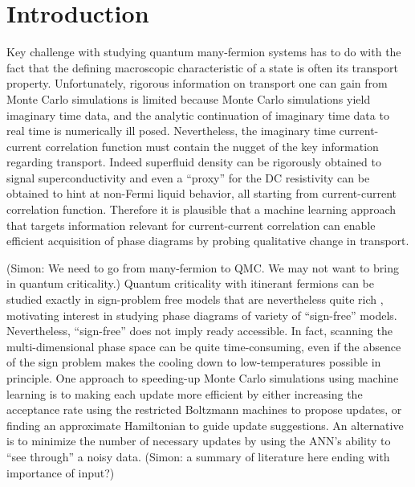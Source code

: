 \documentclass[amsmath,amssymb, aps, prl, twocolumn]{revtex4-1}
\begin{document}
\maketitle

\section{Introduction}

Key challenge with studying quantum many-fermion systems has to do with the fact that the defining macroscopic characteristic of a state is often its transport property. Unfortunately, 
rigorous information on transport one can gain from Monte Carlo simulations is limited because Monte Carlo simulations yield imaginary time data, and the analytic continuation of imaginary time data to real time is numerically ill posed. Nevertheless, the imaginary time current-current correlation function must contain the nugget of the key information regarding transport. Indeed 
superfluid density can be rigorously obtained to signal superconductivity\cite{Scalapino1993} and even a “proxy” for the DC resistivity can be obtained to hint at non-Fermi liquid behavior\cite{Lederer2017}, all starting from current-current correlation function. Therefore it is plausible that a machine learning approach that targets information relevant for current-current correlation can enable efficient acquisition of phase diagrams by probing qualitative change in transport.

{\color{red} (Simon: We need to go from many-fermion to QMC. We may not want to bring in quantum criticality.)} Quantum criticality with itinerant fermions can be studied exactly in sign-problem free models that are nevertheless quite rich \cite{Berg2012,Schattner2016a,Gerlach2017,Xu2017a,Lederer2017,Li2016,Li2017,Jiang2017}, motivating interest in studying phase diagrams of variety of  “sign-free” models. Nevertheless, ``sign-free'' does not imply ready accessible. 
In fact, scanning the multi-dimensional phase space can be quite time-consuming, even if the absence of the sign problem makes the cooling down to low-temperatures possible in principle. One approach to speeding-up Monte Carlo simulations using machine learning is to making each update more efficient by either increasing the acceptance rate using the restricted Boltzmann machines to propose updates\cite{Huang2017}, or finding an approximate Hamiltonian to guide update suggestions\cite{Liu2017}. 
An alternative is to minimize the number of necessary updates by using the ANN’s ability to “see through” a noisy data. {\color{red} (Simon: a summary of literature here ending with importance of input?)}
\end{document}
